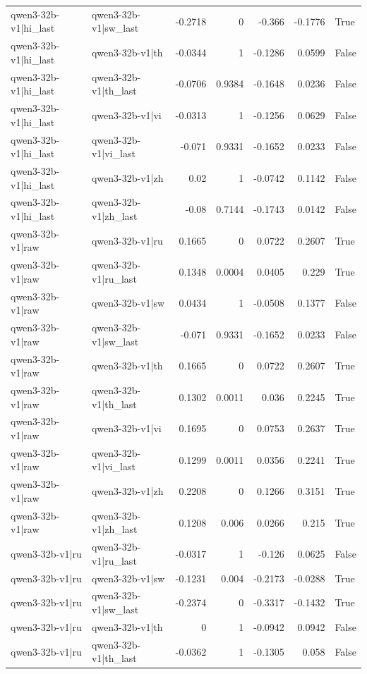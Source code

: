 \begin{table}
\begin{tabular}{l l r r r r l}
qwen3-32b-v1|hi_last & qwen3-32b-v1|sw_last & -0.2718 & 0 & -0.366 & -0.1776 & True \\
qwen3-32b-v1|hi_last & qwen3-32b-v1|th & -0.0344 & 1 & -0.1286 & 0.0599 & False \\
qwen3-32b-v1|hi_last & qwen3-32b-v1|th_last & -0.0706 & 0.9384 & -0.1648 & 0.0236 & False \\
qwen3-32b-v1|hi_last & qwen3-32b-v1|vi & -0.0313 & 1 & -0.1256 & 0.0629 & False \\
qwen3-32b-v1|hi_last & qwen3-32b-v1|vi_last & -0.071 & 0.9331 & -0.1652 & 0.0233 & False \\
qwen3-32b-v1|hi_last & qwen3-32b-v1|zh & 0.02 & 1 & -0.0742 & 0.1142 & False \\
qwen3-32b-v1|hi_last & qwen3-32b-v1|zh_last & -0.08 & 0.7144 & -0.1743 & 0.0142 & False \\
qwen3-32b-v1|raw & qwen3-32b-v1|ru & 0.1665 & 0 & 0.0722 & 0.2607 & True \\
qwen3-32b-v1|raw & qwen3-32b-v1|ru_last & 0.1348 & 0.0004 & 0.0405 & 0.229 & True \\
qwen3-32b-v1|raw & qwen3-32b-v1|sw & 0.0434 & 1 & -0.0508 & 0.1377 & False \\
qwen3-32b-v1|raw & qwen3-32b-v1|sw_last & -0.071 & 0.9331 & -0.1652 & 0.0233 & False \\
qwen3-32b-v1|raw & qwen3-32b-v1|th & 0.1665 & 0 & 0.0722 & 0.2607 & True \\
qwen3-32b-v1|raw & qwen3-32b-v1|th_last & 0.1302 & 0.0011 & 0.036 & 0.2245 & True \\
qwen3-32b-v1|raw & qwen3-32b-v1|vi & 0.1695 & 0 & 0.0753 & 0.2637 & True \\
qwen3-32b-v1|raw & qwen3-32b-v1|vi_last & 0.1299 & 0.0011 & 0.0356 & 0.2241 & True \\
qwen3-32b-v1|raw & qwen3-32b-v1|zh & 0.2208 & 0 & 0.1266 & 0.3151 & True \\
qwen3-32b-v1|raw & qwen3-32b-v1|zh_last & 0.1208 & 0.006 & 0.0266 & 0.215 & True \\
qwen3-32b-v1|ru & qwen3-32b-v1|ru_last & -0.0317 & 1 & -0.126 & 0.0625 & False \\
qwen3-32b-v1|ru & qwen3-32b-v1|sw & -0.1231 & 0.004 & -0.2173 & -0.0288 & True \\
qwen3-32b-v1|ru & qwen3-32b-v1|sw_last & -0.2374 & 0 & -0.3317 & -0.1432 & True \\
qwen3-32b-v1|ru & qwen3-32b-v1|th & 0 & 1 & -0.0942 & 0.0942 & False \\
qwen3-32b-v1|ru & qwen3-32b-v1|th_last & -0.0362 & 1 & -0.1305 & 0.058 & False \\

\end{tabular}
\end{table}
